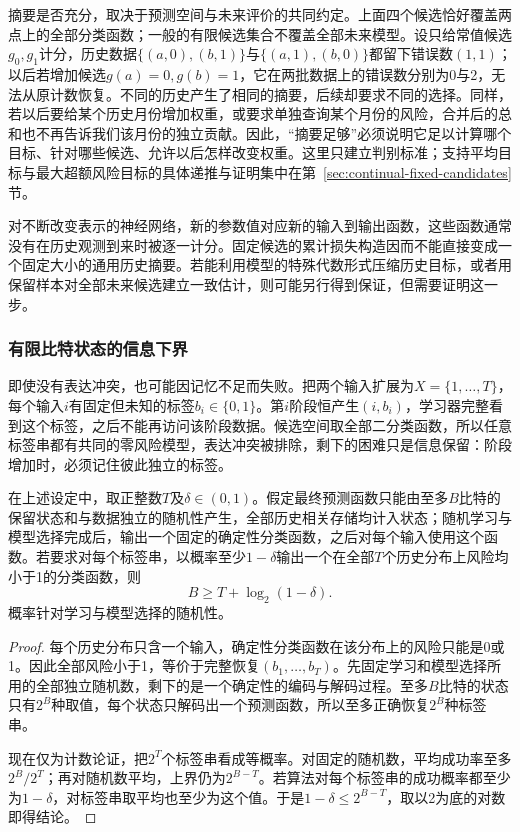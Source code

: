 摘要是否充分，取决于预测空间与未来评价的共同约定。上面四个候选恰好覆盖两点上的全部分类函数；一般的有限候选集合不覆盖全部未来模型。设只给常值候选$g_0,g_1$计分，历史数据$\{(a,0),(b,1)\}$与$\{(a,1),(b,0)\}$都留下错误数$(1,1)$；以后若增加候选$g(a)=0,g(b)=1$，它在两批数据上的错误数分别为0与2，无法从原计数恢复。不同的历史产生了相同的摘要，后续却要求不同的选择。同样，若以后要给某个历史月份增加权重，或要求单独查询某个月份的风险，合并后的总和也不再告诉我们该月份的独立贡献。因此，“摘要足够”必须说明它足以计算哪个目标、针对哪些候选、允许以后怎样改变权重。这里只建立判别标准；支持平均目标与最大超额风险目标的具体递推与证明集中在第~\ref{sec:continual-fixed-candidates}节。

对不断改变表示的神经网络，新的参数值对应新的输入到输出函数，这些函数通常没有在历史观测到来时被逐一计分。固定候选的累计损失构造因而不能直接变成一个固定大小的通用历史摘要。若能利用模型的特殊代数形式压缩历史目标，或者用保留样本对全部未来候选建立一致估计，则可能另行得到保证，但需要证明这一步。

\subsubsection{有限比特状态的信息下界}

即使没有表达冲突，也可能因记忆不足而失败。把两个输入扩展为$X=\{1,\ldots,T\}$，每个输入$i$有固定但未知的标签$b_i\in\{0,1\}$。第$i$阶段恒产生$(i,b_i)$，学习器完整看到这个标签，之后不能再访问该阶段数据。候选空间取全部二分类函数，所以任意标签串都有共同的零风险模型，表达冲突被排除，剩下的困难只是信息保留：阶段增加时，必须记住彼此独立的标签。

\begin{theorem}[逐历史分布保持的信息下界]
\label{thm:continual-memory-example}
在上述设定中，取正整数$T$及$\delta\in(0,1)$。假定最终预测函数只能由至多$B$比特的保留状态和与数据独立的随机性产生，全部历史相关存储均计入状态；随机学习与模型选择完成后，输出一个固定的确定性分类函数，之后对每个输入使用这个函数。若要求对每个标签串，以概率至少$1-\delta$输出一个在全部$T$个历史分布上风险均小于1的分类函数，则
\[
 B\geq T+\log_2(1-\delta).
\]
概率针对学习与模型选择的随机性。
\end{theorem}
\begin{proof}
每个历史分布只含一个输入，确定性分类函数在该分布上的风险只能是0或1。因此全部风险小于1，等价于完整恢复$(b_1,\ldots,b_T)$。先固定学习和模型选择所用的全部独立随机数，剩下的是一个确定性的编码与解码过程。至多$B$比特的状态只有$2^B$种取值，每个状态只解码出一个预测函数，所以至多正确恢复$2^B$种标签串。

现在仅为计数论证，把$2^T$个标签串看成等概率。对固定的随机数，平均成功率至多$2^B/2^T$；再对随机数平均，上界仍为$2^{B-T}$。若算法对每个标签串的成功概率都至少为$1-\delta$，对标签串取平均也至少为这个值。于是$1-\delta\leq2^{B-T}$，取以2为底的对数即得结论。
\end{proof}

